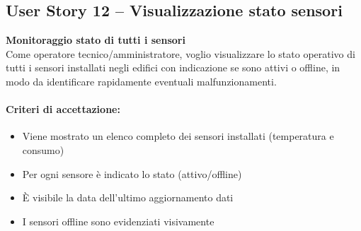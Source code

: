 \subsection{User Story 12 – Visualizzazione stato sensori}
\label{us:statoSensori}

\textbf{Monitoraggio stato di tutti i sensori} \\
Come operatore tecnico/amministratore, voglio visualizzare lo stato operativo di tutti i sensori installati negli edifici con indicazione se sono attivi o offline, in modo da identificare rapidamente eventuali malfunzionamenti.

\paragraph*{Criteri di accettazione:}
\begin{itemize}
    \item Viene mostrato un elenco completo dei sensori installati (temperatura e consumo)
    \item Per ogni sensore è indicato lo stato (attivo/offline)
    \item È visibile la data dell'ultimo aggiornamento dati
    \item I sensori offline sono evidenziati visivamente
\end{itemize}

